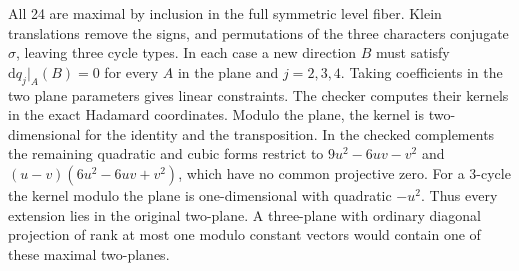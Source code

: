 All 24 are maximal by inclusion in the full symmetric level fiber.
Klein translations remove the signs, and permutations of the three
characters conjugate \(\sigma\), leaving three cycle types. In each
case a new direction \(B\) must satisfy
\(\mathrm d q_j|_A(B)=0\) for every \(A\) in the plane and
\(j=2,3,4\). Taking coefficients in the two plane parameters gives
linear constraints. The checker computes their kernels in the exact
Hadamard coordinates. Modulo the plane, the kernel is two-dimensional
for the identity and the transposition. In the checked complements
the remaining quadratic and cubic forms restrict to
\(9u^2-6uv-v^2\) and \((u-v)(6u^2-6uv+v^2)\), which have no common
projective zero. For a 3-cycle the kernel modulo the plane is
one-dimensional with quadratic \(-u^2\). Thus every extension lies in
the original two-plane. A three-plane with ordinary diagonal
projection of rank at most one modulo constant vectors would contain
one of these maximal two-planes.

